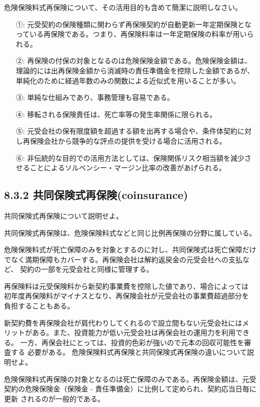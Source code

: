 \documentclass[report,gutter=10mm,fore-edge=10mm,uplatex,dvipdfmx]{jlreq}
\begin{document}
危険保険料式再保険について、その活用目的も含めて簡潔に説明しなさい。
\answer{}
\begin{itemize}
\item[ ①: ] 元受契約の保険種類に関わらず再保険契約が自動更新一年定期保険となっている再保険である。つまり、再保険料率は一年定期保険の料率が用いられる。
\item[ ②: ] 再保険の付保の対象となるのは危険保険金額である。危険保険金額は、理論的には出再保険金額から消滅時の責任準備金を控除した金額であるが、単純化のために経過年数のみの関数による近似式を用いることが多い。
\item[ ③: ] 単純な仕組みであり、事務管理も容易である。
\item[ ④: ] 移転される保険責任は、死亡率等の発生率関係に限られる。
\item[ ⑤: ] 元受会社の保有限度額を超過する額を出再する場合や、条件体契約に対し再保険会社から競争的な評点の提供を受ける場合に活用される。
\item[ ⑥: ] 非伝統的な目的での活用方法としては、保険関係リスク相当額を減少させることによるソルベンシー・マージン比率の改善があげられる。
\end{itemize}

\subsection{8.3.2 共同保険式再保険(coinsurance)}
共同保険式再保険について説明せよ。
\answer{}

共同保険式再保険は、危険保険料式などと同じ比例再保険の分野に属している。

危険保険料式が死亡保障のみを対象とするのに対し、共同保険式は死亡保障だけ
でなく満期保障もカバーする。再保険会社は解約返戻金の元受会社への支払など、
契約の一部を元受会社と同様に管理する。

再保険料は元受保険料から新契約事業費を控除した値であり、場合によっては
初年度再保険料がマイナスとなり、再保険会社が元受会社の事業費超過部分を
負担することもある。

新契約費を再保険会社が肩代わりしてくれるので設立間もない元受会社にはメ
リットがある。また、投資能力が低い元受会社は再保会社の運用力を利用できる。
一方、再保会社にとっては、投資的色彩が強いので元本の回収可能性を審査する
必要がある。
危険保険料式再保険と共同保険式再保険の違いについて説明せよ。
\answer{}

危険保険料式再保険の対象となるのは死亡保障のみである。再保険金額は、元受
契約の危険保険金（保険金 - 責任準備金）に比例して定められ、契約応当日毎に更新
されるのが一般的である。
\end{document}
